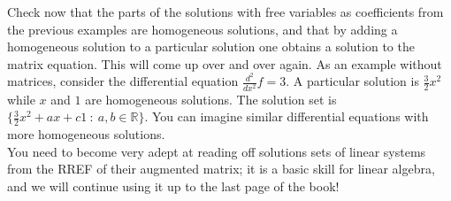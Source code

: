 Check now that the parts of the solutions with free variables as coefficients from the previous examples are homogeneous solutions, and that by adding a homogeneous solution to a particular solution one obtains a solution to the matrix equation. This will come up over and over again. As an example without matrices, consider the differential equation $\frac{d^2}{dx^2} f=3$. A particular solution is $\frac32x^2$ while $x$ and $1$ are homogeneous solutions. The solution set is $\{ \frac32 x^2+ax +c1 ~:~a,b\in\mathbb{R} \}$. You can imagine similar differential equations with more homogeneous solutions. \\


You need to become very adept at reading off solutions sets of linear systems from the RREF
of their augmented matrix; it is a basic skill for linear algebra, and we will continue using it up to the last page of the book! 







